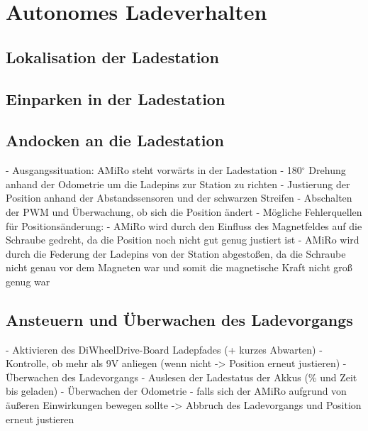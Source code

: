 \chapter{Autonomes Ladeverhalten} \label{kap:AutonomesLadeverhalten}

\section{Lokalisation der Ladestation} %

\section{Einparken in der Ladestation} %

\section{Andocken an die Ladestation} %

- Ausgangssituation: AMiRo steht vorwärts in der Ladestation
- 180$^\circ$ Drehung anhand der Odometrie um die Ladepins zur Station zu richten
- Justierung der Position anhand der Abstandssensoren und der schwarzen Streifen
- Abschalten der PWM und Überwachung, ob sich die Position ändert 
	- Mögliche Fehlerquellen für Positionsänderung: 
		- AMiRo wird durch den Einfluss des Magnetfeldes auf die Schraube gedreht, da die Position noch nicht gut genug justiert ist
		- AMiRo wird durch die Federung der Ladepins von der Station abgestoßen, da die Schraube nicht genau vor dem Magneten war und somit die magnetische Kraft nicht groß genug war 

\section{Ansteuern und Überwachen des Ladevorgangs} %
- Aktivieren des DiWheelDrive-Board Ladepfades (+ kurzes Abwarten)
- Kontrolle, ob mehr als 9V anliegen (wenn nicht -> Position erneut justieren)
- Überwachen des Ladevorgangs
	- Auslesen der Ladestatus der Akkus (\% und Zeit bis geladen)
	- Überwachen der Odometrie 
		- falls sich der AMiRo aufgrund von äußeren Einwirkungen bewegen sollte -> Abbruch des Ladevorgangs und Position erneut justieren


